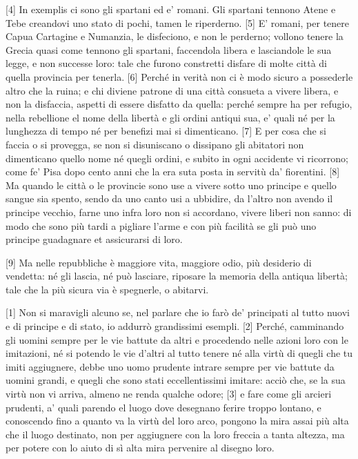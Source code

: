 {[}4{]} In exemplis ci sono gli spartani ed e' romani. Gli spartani
tennono Atene e Tebe creandovi uno stato di pochi, tamen le riperderno.
{[}5{]} E' romani, per tenere Capua Cartagine e Numanzia, le disfeciono,
e non le perderno; vollono tenere la Grecia quasi come tennono gli
spartani, faccendola libera e lasciandole le sua legge, e non successe
loro: tale che furono constretti disfare di molte città di quella
provincia per tenerla. {[}6{]} Perché in verità non ci è modo sicuro a
possederle altro che la ruina; e chi diviene patrone di una città
consueta a vivere libera, e non la disfaccia, aspetti di essere disfatto
da quella: perché sempre ha per refugio, nella rebellione el nome della
libertà e gli ordini antiqui sua, e' quali né per la lunghezza di tempo
né per benefizi mai si dimenticano. {[}7{]} E per cosa che si faccia o
si provegga, se non si disuniscano o dissipano gli abitatori non
dimenticano quello nome né quegli ordini, e subito in ogni accidente vi
ricorrono; come fe' Pisa dopo cento anni che la era suta posta in
servitù da' fiorentini. {[}8{]} Ma quando le città o le provincie sono
use a vivere sotto uno principe e quello sangue sia spento, sendo da uno
canto usi a ubbidire, da l'altro non avendo il principe vecchio, farne
uno infra loro non si accordano, vivere liberi non sanno: di modo che
sono più tardi a pigliare l'arme e con più facilità se gli può uno
principe guadagnare et assicurarsi di loro.

{[}9{]} Ma nelle repubbliche è maggiore vita, maggiore odio, più
desiderio di vendetta: né gli lascia, né può lasciare, riposare la
memoria della antiqua libertà; tale che la più sicura via è spegnerle, o
abitarvi.


{[}1{]} Non si maravigli alcuno se, nel parlare che io farò de'
principati al tutto nuovi e di principe e di stato, io addurrò
grandissimi esempli. {[}2{]} Perché, camminando gli uomini sempre per le
vie battute da altri e procedendo nelle azioni loro con le imitazioni,
né si potendo le vie d'altri al tutto tenere né alla virtù di quegli che
tu imiti aggiugnere, debbe uno uomo prudente intrare sempre per vie
battute da uomini grandi, e quegli che sono stati eccellentissimi
imitare: acciò che, se la sua virtù non vi arriva, almeno ne renda
qualche odore; {[}3{]} e fare come gli arcieri prudenti, a' quali
parendo el luogo dove desegnano ferire troppo lontano, e conoscendo fino
a quanto va la virtù del loro arco, pongono la mira assai più alta che
il luogo destinato, non per aggiugnere con la loro freccia a tanta
altezza, ma per potere con lo aiuto di sì alta mira pervenire al disegno
loro.

